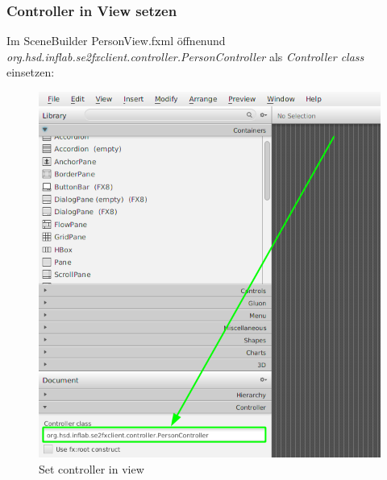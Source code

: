 \documentclass[11pt]{scrartcl}
\begin{document}
\subsubsection{Controller in View setzen}
\label{sec:setcontrollerinview}
Im SceneBuilder PersonView.fxml öffnen\newline und 
\textit{org.hsd.inflab.se2fxclient.controller.PersonController}
als \textit{Controller class} einsetzen:
\begin{figure}[!ht]
    \includegraphics[width=\linewidth]{images/eclipse26_set_controller_in_fxml.png}
    \caption{Set controller in view}
    \label{fig:setcontrollerinview}
\end{figure}


\newpage
\end{document}
